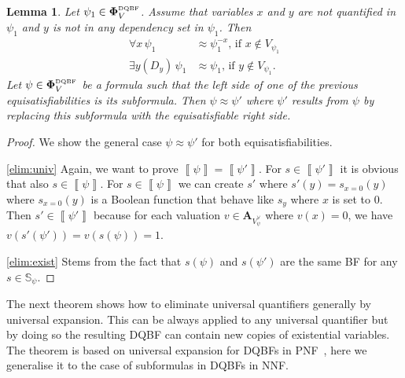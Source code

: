 \documentclass[
  digital, %
  color,
  twoside, %
  table,   %
  nolof,     %
  nolot,     %
]{fithesis3}
\newtheorem{lemma}[theorem]{Lemma}         %
\theoremstyle{definition}
\theoremstyle{remark}
\newcommand{\seman}[1]{\left\llbracket {#1} \right\rrbracket}
\newcommand{\DQBF}[1]{\mathbf{\Phi}_{#1}^{\normalfont{\text{\tiny DQBF}}}}
\newcommand{\valtns}[1]{\mathbf{A}_{#1}}
\newcommand{\vars}[1]{V_{#1}}
\newcommand{\uvars}[1]{V_{#1}^{\forall}}
\newcommand{\Scands}[1]{\mathbb{S}_{#1}}
\newcommand{\itholds}{\,}
\begin{document}
\begin{lemma}
\label{lemma:elimination}
Let $\psi_1 \in \DQBF{V}$. Assume that variables $x$ and $y$ are not quantified in $\psi_1$ and $y$ is not in any dependency set in $\psi_1$. Then
\begin{align}
    \forall x \itholds \psi_1 &\approx \psi_1^{-x} \text{, if } x \not\in \vars{\psi_1}\tag{i}\label{elim:univ}\\
    \exists y(D_y) \itholds \psi_1 &\approx \psi_1 \text{, if } y \not\in \vars{\psi_1}.\tag{j}\label{elim:exist}
\end{align}
Let $\psi \in \DQBF{V}$ be a formula such that the left side of one of the previous equisatisfiabilities is its subformula. Then $\psi \approx \psi'$ where $\psi'$ results from $\psi$ by replacing this subformula with the equisatisfiable right side.
\end{lemma}
\begin{proof}
  We show the general case $\psi \approx \psi'$ for both equisatisfiabilities.
  
  \eqref{elim:univ} Again, we want to prove $\seman{\psi} = \seman{\psi'}$. For $s \in \seman{\psi'}$ it is obvious that also $s \in \seman{\psi}$. For $s \in \seman{\psi}$ we can create $s'$ where $s'(y) = s_{x=0}(y)$ where $s_{x=0}(y)$ is a Boolean function that behave like $s_y$ where $x$ is set to $0$. Then $s' \in \seman{\psi'}$ because for each valuation $v \in \valtns{\uvars{\psi}}$ where $v(x) = 0$, we have $v(s'(\psi')) = v(s(\psi)) = 1$.
  
  \eqref{elim:exist} Stems from the fact that $s(\psi)$ and $s(\psi')$ are the same BF for any $s \in \Scands{\psi}$.
\end{proof}

The next theorem shows how to eliminate universal quantifiers generally by universal expansion. This can be always applied to any universal quantifier but by doing so the resulting DQBF can contain new copies of existential variables. The theorem is based on universal expansion for DQBFs in PNF~\cite{HQSsimpleAlg,NegationOfDQBFs}, here we generalise it to the case of subformulas in DQBFs in NNF.
\end{document}
